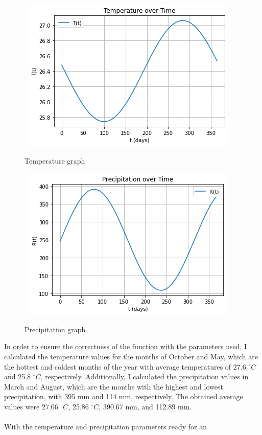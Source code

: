 \begin{figure}[!ht]
        \centering
        \hbox{\hspace{6.0em} \includegraphics[scale=0.7] {THESIS-Grafico_da_Temperatura.png}}
        \caption{Temperature graph}
\end{figure} 
\begin{figure}[!ht]
        \centering
        \hbox{\hspace{6.5em} \includegraphics[scale=0.7] {THESIS-Grafico_da_Precipitacao.png}}
        \caption{Precipitation graph}
\end{figure} 
In order to ensure the correctness of the function 
with the parameters used, I calculated the temperature 
values for the months of October and May, which are the 
hottest and coldest months of the year with average 
temperatures of 27.6 $^\circ C$ and 25.8 $^\circ C$, respectively. 
Additionally, I calculated the precipitation values in March 
and August, which are the months with the highest and lowest 
precipitation, with 395 mm and 114 mm, respectively. 
The obtained average values were 27.06 $^\circ C$, 25.86 $^\circ C$, 
390.67 mm, and 112.89 mm. 
\\\\With the temperature and precipitation parameters ready for an 
